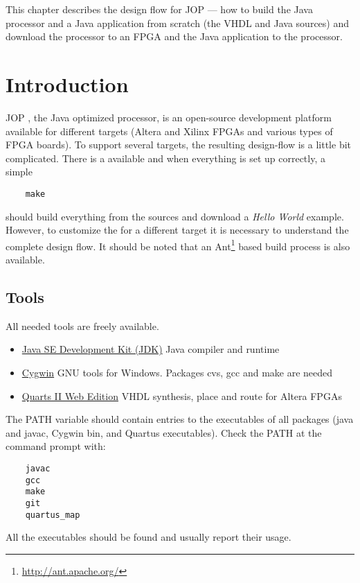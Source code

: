 
This chapter describes the design flow for JOP --- how to build the
Java processor and a Java application from scratch (the VHDL and Java
sources) and download the processor to an FPGA and the Java
application to the processor.


\section{Introduction}

JOP \cite{jop:thesis}, the Java optimized processor, is an
open-source development platform available for different targets
(Altera and Xilinx FPGAs and various types of FPGA boards). To
support several targets, the resulting design-flow is a little bit
complicated. There is a  available and when everything
is set up correctly, a simple
%
\begin{lstlisting}
    make
\end{lstlisting}
%
should build everything from the sources and download a \emph{Hello
World} example. However, to customize the  for a
different target it is necessary to understand the complete design
flow. It should be noted that an
Ant\footnote{\url{http://ant.apache.org/}} based build process is
also available.

\subsection{Tools}

All needed tools are freely available.
%
\begin{itemize}
    \item  \href{http://java.sun.com/javase/downloads/index.jsp}%
{Java SE Development Kit (JDK)}  Java compiler and runtime
    \item  \href{http://www.cygwin.com/}%
{Cygwin} GNU tools for Windows. Packages cvs, gcc and make are
needed
    \item  \href{https://www.altera.com/support/software/download/altera_design/quartus_we/dnl-quartus_we.jsp}%
{Quarts II Web Edition} VHDL synthesis, place and route for Altera
FPGAs

\end{itemize}
%
The PATH variable should contain entries to the executables of all
packages (java and javac, Cygwin bin, and Quartus executables). Check
the PATH at the command prompt with:
%
\begin{lstlisting}
    javac
    gcc
    make
    git
    quartus_map
\end{lstlisting}
%
All the executables should be found and usually report their usage.

